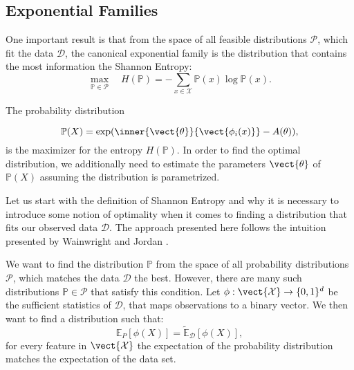     
    \subsection{Exponential Families}
    \label{ssec:expf}
    One important result is that from the space of all feasible distributions $\mathcal{P}$, which fit the data $\mathcal{D}$, the canonical exponential family is the distribution that contains the most information \wrt the Shannon Entropy:
    \begin{equation}
    \max_{\mathbb{P}\in \mathcal{P}} \quad  H(\mathbb{P}) = - \sum_{x\in\mathcal{X}} \mathbb{P}(x) \log \mathbb{P}(x).
    \end{equation}

    The probability distribution

    \begin{equation}
        \mathbb{P}(X) = \exp(\inner{\vect{\theta}}{\vect{\phi_i(x)}} - A(\theta)),
    \end{equation}
    is the maximizer for the entropy $H(\mathbb{P})$.
    In order to find the optimal distribution, we additionally need to estimate the parameters $\vect{\theta}$ of $\mathbb{P}(X)$ assuming the distribution is parametrized.

    Let us start with the definition of Shannon Entropy and why it is necessary to introduce some notion of optimality when it comes to finding a distribution that fits our observed data $\mathcal{D}$.
    The approach presented here follows the intuition presented by Wainwright and Jordan \cite{wainwright2008graphical}.

    We want to find the distribution $\mathbb{P}$ from the space of all probability distributions $\mathcal{P}$, which matches the data  $\mathcal{D}$ the best.
    However, there are many such distributions $\mathbb{P} \in \mathcal{P}$ that satisfy this condition. 
    Let $\phi: \vect{\mathcal{X}}  \rightarrow \{0,1\}^d$ be the sufficient statistics of $\mathcal{D}$, that maps observations to a binary vector. 
    We then want to find a distribution such that:
    \begin{equation}
        \label{eq:expecval}
        \mathbb{E}_P[\phi(X)] = \tilde{\mathbb{E}}_{\mathcal{D}}[\phi(X)], 
    \end{equation}
    for every feature in $\vect{\mathcal{X}}$ the expectation of the probability distribution matches the expectation of the data set.

